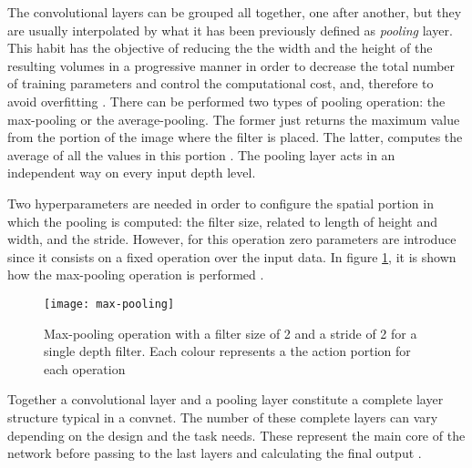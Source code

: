 	The convolutional layers can be grouped all together, one after another, but they are usually interpolated by what it has been previously defined as \textit{pooling} layer. This habit has the objective of reducing the the width and the height of the resulting volumes in a progressive manner in order to decrease the total number of training parameters and control the computational cost, and, therefore to avoid overfitting \cite{Karpathy2016} . There can be performed two types of pooling operation: the max-pooling or the average-pooling. The former just returns the maximum value from the portion of the image where the filter is placed. The latter, computes the average of all the values in this portion \cite{Saha2018}. The pooling layer acts in an independent way on every input depth level. 
	
	Two hyperparameters are needed in order to configure the spatial portion in which the pooling is computed: the  filter size, related to length of height and width, and the stride. However, for this operation zero parameters are introduce since it consists on a fixed operation over the input data. In figure \ref{fig:mesh12}, it is shown how the max-pooling operation is performed \cite{Karpathy2016}. 
	
	\begin{figure}[ht]
		\centering
		\captionsetup{justification=centering}
		\texttt{[image: max-pooling]}
		\caption{Max-pooling operation with a filter size of 2 and a stride of 2 for a single depth filter. Each colour represents a the action portion for each operation \cite{Karpathy2016}}
		\label{fig:mesh12}
	\end{figure}
	
	Together a convolutional layer and a pooling layer constitute a complete layer structure typical in a \acrlong{convnet}. The number of these complete layers can vary depending on the design and the task needs. These represent the main core of the network before passing to the last layers and calculating the final output \cite{Saha2018}.
	
